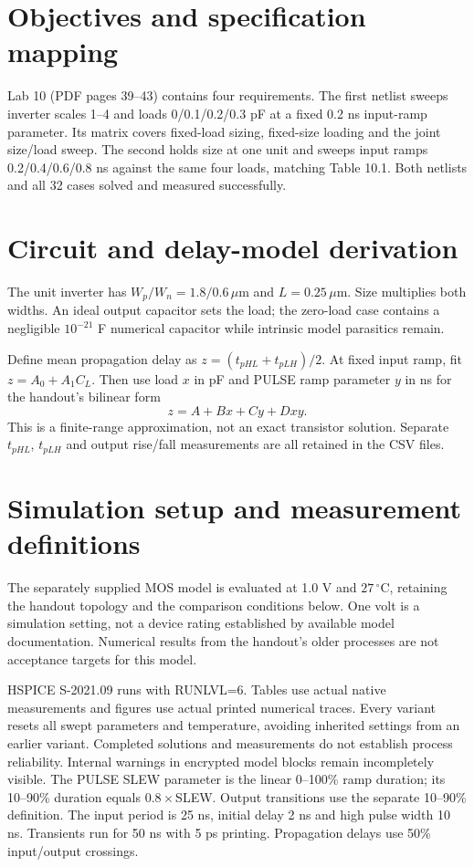 \section{Objectives and specification mapping}
Lab 10 (PDF pages 39--43) contains four requirements. The first netlist sweeps inverter scales 1--4 and loads 0/0.1/0.2/0.3 pF at a fixed 0.2 ns input-ramp parameter. Its matrix covers fixed-load sizing, fixed-size loading and the joint size/load sweep. The second holds size at one unit and sweeps input ramps 0.2/0.4/0.6/0.8 ns against the same four loads, matching Table 10.1. Both netlists and all 32 cases solved and measured successfully.

\section{Circuit and delay-model derivation}
The unit inverter has $W_p/W_n=1.8/0.6\,\mu$m and $L=0.25\,\mu$m. Size multiplies both widths. An ideal output capacitor sets the load; the zero-load case contains a negligible $10^{-21}$ F numerical capacitor while intrinsic model parasitics remain.

Define mean propagation delay as $z=(t_{pHL}+t_{pLH})/2$. At fixed input ramp, fit $z=A_0+A_1C_L$. Then use load $x$ in pF and PULSE ramp parameter $y$ in ns for the handout's bilinear form
\[z=A+Bx+Cy+Dxy.\]
This is a finite-range approximation, not an exact transistor solution. Separate $t_{pHL}$, $t_{pLH}$ and output rise/fall measurements are all retained in the CSV files.

\section{Simulation setup and measurement definitions}
The separately supplied MOS model is evaluated at 1.0 V and $27\,^{\circ}$C, retaining the handout topology and the comparison conditions below. One volt is a simulation setting, not a device rating established by available model documentation. Numerical results from the handout's older processes are not acceptance targets for this model.

HSPICE S-2021.09 runs with RUNLVL=6. Tables use actual native measurements and figures use actual printed numerical traces. Every variant resets all swept parameters and temperature, avoiding inherited settings from an earlier variant. Completed solutions and measurements do not establish process reliability. Internal warnings in encrypted model blocks remain incompletely visible.
The PULSE SLEW parameter is the linear 0--100\% ramp duration; its 10--90\% duration equals $0.8\times$SLEW. Output transitions use the separate 10--90\% definition. The input period is 25 ns, initial delay 2 ns and high pulse width 10 ns. Transients run for 50 ns with 5 ps printing. Propagation delays use 50\% input/output crossings.

